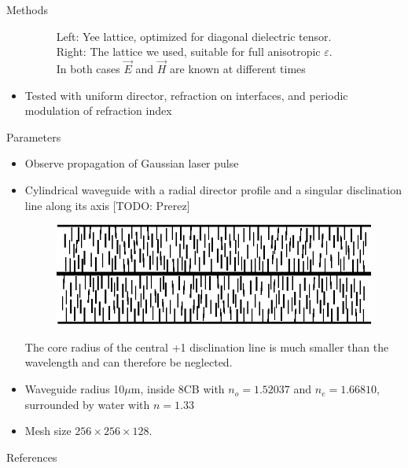 \documentclass{beamer}
\newlength{\wideitemsep}
\let\olditem\item
\renewcommand{\item}{\setlength{\itemsep}{\wideitemsep}\olditem}
\newcommand{\blockpadding}{
  \rule[-0.6ex]{0pt}{2.5ex}
}
\begin{document}
\begin{columns}[t]
\begin{column}{.36\textwidth}
\begin{block}{\blockpadding Methods}
\begin{itemize}
\begin{figure}[h]
{}
\label{fig:lattice}
\caption{{\color{dark} Left:} Yee lattice, optimized for diagonal dielectric tensor. \\{\color{dark} Right:} The lattice we used, suitable for full anisotropic $\varepsilon$. \\In both cases $\vec E$ and $\vec H$ are known at different times}
\end{figure}
  \item Tested with uniform director, refraction on interfaces, and periodic modulation of refraction index
  \end{itemize}
  \end{block}
  
  \begin{block}{\blockpadding Parameters}
  \begin{itemize}
  \item Observe propagation of Gaussian laser pulse

\item Cylindrical waveguide with a radial director profile and a singular disclination line along its axis [TODO: Prerez] \\
\begin{figure}[h]
\centering
\includegraphics[width=.5\textwidth]{../Magisterij/Slike/director-profile-radial}
\end{figure}
The core radius of the central +1 disclination line is much smaller than the wavelength and can therefore be neglected. 
\item Waveguide radius 10$\mu$m, inside 8CB with $n_o = 1.52037$ and $n_e = 1.66810$, surrounded by water with $n = 1.33$
\item Mesh size $256 \times 256 \times 128$.

 \end{itemize}
 \end{block}
 
 \begin{block}{\blockpadding References}
  
 \end{block}



\end{column}
\end{columns}
\end{document}
